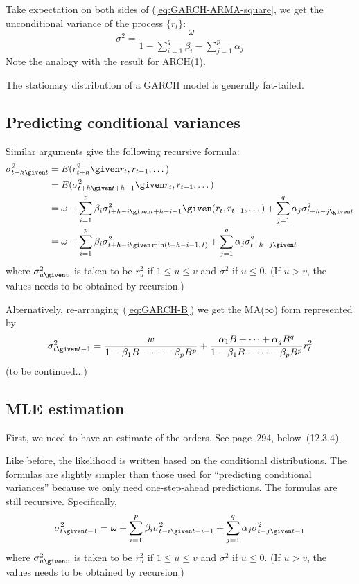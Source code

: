 \documentclass[12pt]{article}
\begin{document}
Take expectation on both sides of (\ref{eq:GARCH-ARMA-square}, we get
the unconditional variance of the process $\{r_t\}$:
\[
\sigma^2
= \frac{\omega}{1 - \sum_{i=1}^q \beta_i - \sum_{j=1}^p \alpha_j}
\]
Note the analogy with the result for ARCH(1).

The stationary distribution of a GARCH model is generally fat-tailed.

\subsection{Predicting conditional variances}

Similar arguments give the following recursive formula:
\begin{align*}
\sigma^2_{t+h\given t}
&= E(r^2_{t+h} \given r_t, r_{t-1},\dotsc)
\\
&= E(\sigma^2_{t+h\given t+h-1} \given r_t,r_{t-1},\dotsc)
\\
&= \omega
     + \sum_{i=1}^p \beta_i \sigma^2_{t+h-i\given t+h-i-1}
             \given (r_t,r_{t-1},\dotsc)
     + \sum_{j=1}^q \alpha_j \sigma^2_{t+h-j\given t}
\\
&= \omega
     + \sum_{i=1}^p \beta_i \sigma^2_{t+h-i\given \min(t+h-i-1,\, t)}
     + \sum_{j=1}^q \alpha_j \sigma^2_{t+h-j\given t}
\end{align*}
where
$\sigma^2_{u\given v}$
is taken to be
$r_u^2$ if $1 \le u \le v$
and
$\sigma^2$ if $u \le 0$.
(If $u > v$, the values needs to be obtained by recursion.)


Alternatively, re-arranging~(\ref{eq:GARCH-B}) we get the
MA($\infty$) form represented by
\[
\sigma^2_{t\given t-1}
= \frac{w}{1 - \beta_1B - \dotsb - \beta_pB^p}
    + \frac{\alpha_1B + \dotsb + \alpha_qB^q}
        {1 - \beta_1B -\dotsb - \beta_pB^p} r_t^2
\]
(to be continued...)

\subsection{MLE estimation}

First, we need to have an estimate of the orders.
See page~294, below~(12.3.4).

Like before,
the likelihood is written based on the conditional distributions.
The formulas are slightly simpler than those used for
``predicting conditional variances''
because we only need one-step-ahead predictions.
The formulas are still recursive.
Specifically,
\[
\sigma^2_{t\given t-1}
= \omega
    + \sum_{i=1}^p \beta_i \sigma^2_{t-i\given t-i-1}
    + \sum_{j=1}^q \alpha_j \sigma^2_{t-j\given t-1}
\]
where
$\sigma^2_{u\given v}$
is taken to be
$r_u^2$ if $1 \le u \le v$
and
$\sigma^2$ if $u \le 0$.
(If $u > v$, the values needs to be obtained by recursion.)
\end{document}
